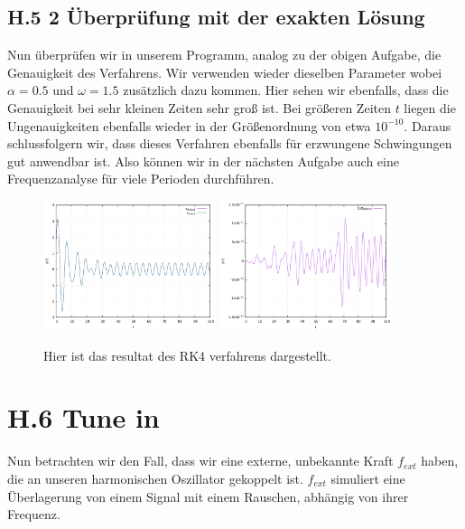 \documentclass[ngerman]{scrartcl}
\begin{document}
\subsection{H.5 2 Überprüfung mit der exakten Lösung}
Nun überprüfen wir in unserem Programm, analog zu der obigen Aufgabe, die Genauigkeit des Verfahrens.  Wir verwenden wieder dieselben Parameter wobei $\alpha=0.5$ und $\omega=1.5$ zusätzlich dazu kommen. Hier sehen wir ebenfalls, dass die Genauigkeit bei sehr kleinen Zeiten sehr groß ist. Bei größeren Zeiten $t$ liegen die Ungenauigkeiten ebenfalls wieder in der Größenordnung von etwa $10^{-10}$. Daraus schlussfolgern wir, dass dieses Verfahren ebenfalls für erzwungene Schwingungen gut anwendbar ist. Also können wir in der nächsten Aufgabe auch eine Frequenzanalyse für viele Perioden durchführen.
\begin{figure}[htbp]
	\centering
	\includegraphics[width=0.45\textwidth]{ruku_extern}
	\includegraphics[width=0.45\textwidth]{ruku_extern_fehler}
	\caption[$f{ext}$]{Hier ist das resultat des RK4 verfahrens dargestellt.}
	\label{fig:euler}
\end{figure}
\section{H.6 Tune in}
Nun betrachten wir den Fall, dass wir eine externe, unbekannte Kraft $f_{ext}$ haben, die an unseren harmonischen Oszillator gekoppelt ist. $f_{ext}$ simuliert eine Überlagerung von einem Signal mit einem Rauschen, abhängig von ihrer Frequenz. 
\end{document}
